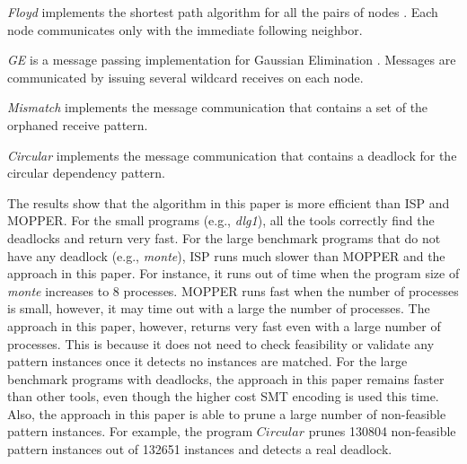 
\textit{Floyd} implements the shortest path algorithm for all the pairs of nodes \cite{DBLP:conf/ppopp/XueLWGCZZV09}. Each node communicates only with the immediate following neighbor.

\textit{GE} is a message passing implementation for Gaussian Elimination  \cite{DBLP:conf/ppopp/XueLWGCZZV09}. Messages are communicated by issuing several wildcard receives on each node. 

\textit{Mismatch} implements the message communication that contains a set of the orphaned receive pattern. 

\textit{Circular} implements the message communication that contains a deadlock for the circular dependency pattern.


The results show that the algorithm in this paper is more efficient than ISP and MOPPER. For the small programs (e.g., \textit{dlg1}), all the tools correctly find the deadlocks and return very fast. For the large benchmark programs that do not have any deadlock (e.g., \textit{monte}), ISP runs much slower than MOPPER and the approach in this paper. For instance, it runs out of time when the program size of \textit{monte} increases to 8 processes. MOPPER runs fast when the number of processes is small, however, it may time out with a large the number of processes. The approach in this paper, however, returns very fast even with a large number of processes. This is because it  does not need to check feasibility or validate any pattern instances once it detects no instances are matched. 
For the large benchmark programs with deadlocks, the approach in this paper remains faster than other tools, even though the higher cost SMT encoding is used this time. 
Also, the approach in this paper is able to prune a large number of non-feasible pattern instances. For example, the program $\mathit{Circular}$ prunes 130804 non-feasible pattern instances out of 132651 instances and detects a real deadlock. 

